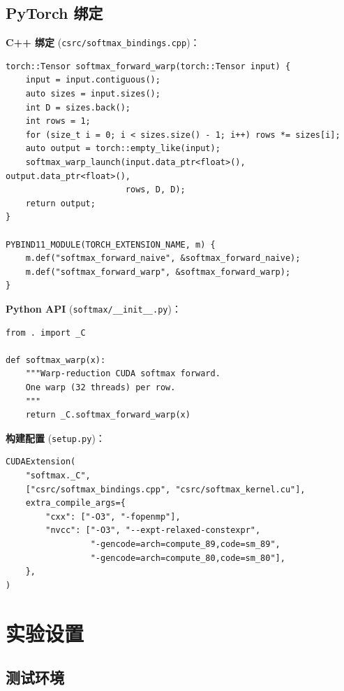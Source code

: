 \documentclass[12pt,a4paper]{ctexart}
\begin{document}
\subsection{PyTorch 绑定}

\textbf{C++ 绑定} (\texttt{csrc/softmax\_bindings.cpp})：

\begin{lstlisting}[style=cuda, caption={C++ Torch 绑定}]
torch::Tensor softmax_forward_warp(torch::Tensor input) {
    input = input.contiguous();
    auto sizes = input.sizes();
    int D = sizes.back();
    int rows = 1;
    for (size_t i = 0; i < sizes.size() - 1; i++) rows *= sizes[i];
    auto output = torch::empty_like(input);
    softmax_warp_launch(input.data_ptr<float>(), output.data_ptr<float>(),
                        rows, D, D);
    return output;
}

PYBIND11_MODULE(TORCH_EXTENSION_NAME, m) {
    m.def("softmax_forward_naive", &softmax_forward_naive);
    m.def("softmax_forward_warp", &softmax_forward_warp);
}
\end{lstlisting}

\textbf{Python API} (\texttt{softmax/\_\_init\_\_.py})：

\begin{lstlisting}[style=python, caption={Python API}]
from . import _C

def softmax_warp(x):
    """Warp-reduction CUDA softmax forward.
    One warp (32 threads) per row.
    """
    return _C.softmax_forward_warp(x)
\end{lstlisting}

\textbf{构建配置} (\texttt{setup.py})：

\begin{lstlisting}[style=python, caption={setup.py 编译配置}]
CUDAExtension(
    "softmax._C",
    ["csrc/softmax_bindings.cpp", "csrc/softmax_kernel.cu"],
    extra_compile_args={
        "cxx": ["-O3", "-fopenmp"],
        "nvcc": ["-O3", "--expt-relaxed-constexpr",
                 "-gencode=arch=compute_89,code=sm_89",
                 "-gencode=arch=compute_80,code=sm_80"],
    },
)
\end{lstlisting}

\section{实验设置}

\subsection{测试环境}
\end{document}
